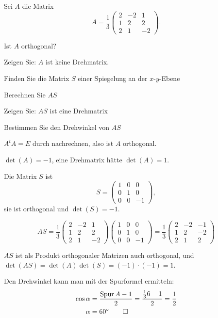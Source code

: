 Sei $A$ die Matrix
\[
A=\frac13\begin{pmatrix}
2&-2& 1\\
1& 2& 2\\
2& 1&-2
\end{pmatrix}.
\]
\begin{teilaufgaben}
\item Ist $A$ orthogonal?
\item Zeigen Sie: $A$ ist keine Drehmatrix.
\item Finden Sie die Matrix $S$ einer Spiegelung an der $x$-$y$-Ebene
\item Berechnen Sie $AS$
\item Zeigen Sie: $AS$ ist eine Drehmatrix
\item Bestimmen Sie den Drehwinkel von $AS$
\end{teilaufgaben}


\begin{loesung}
\begin{teilaufgaben}
\item $A^tA=E$ durch nachrechnen, also ist $A$ orthogonal.
\item $\det(A)=-1$, eine Drehmatrix hätte $\det(A)=1$.
\item Die Matrix $S$ ist
\[
S=\begin{pmatrix}1&0&0\\0&1&0\\0&0&-1\end{pmatrix},
\]
sie ist orthogonal und $\det(S)=-1$.
\item
\[
AS=\frac13\begin{pmatrix}
2&-2& 1\\
1& 2& 2\\
2& 1&-2
\end{pmatrix}
\begin{pmatrix}1&0&0\\0&1&0\\0&0&-1\end{pmatrix}
=
\frac13\begin{pmatrix}
2&-2&-1\\
1& 2&-2\\
2& 1& 2
\end{pmatrix}
\]
\item $AS$ ist als Produkt orthogonaler Matrizen auch orthogonal,
und $\det(AS)=\det(A)\det(S)=(-1)\cdot(-1)=1$.
\item Den Drehwinkel kann man mit der Spurformel ermitteln:
\begin{align*}
\cos\alpha&= \frac{\operatorname{Spur} A -1}2=\frac{\frac136-1}2=\frac12
\\
\alpha&=60^\circ
\qedhere
\end{align*}
\end{teilaufgaben}
\end{loesung}

